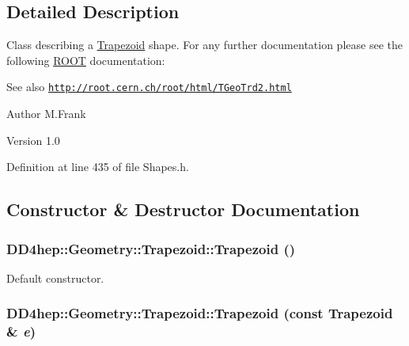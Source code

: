 \subsection{Detailed Description}
Class describing a \hyperlink{class_d_d4hep_1_1_geometry_1_1_trapezoid}{Trapezoid} shape. For any further documentation please see the following \hyperlink{namespace_r_o_o_t}{ROOT} documentation: \begin{DoxySeeAlso}{See also}
\href{http://root.cern.ch/root/html/TGeoTrd2.html}{\tt http://root.cern.ch/root/html/TGeoTrd2.html}
\end{DoxySeeAlso}
\begin{DoxyAuthor}{Author}
M.Frank 
\end{DoxyAuthor}
\begin{DoxyVersion}{Version}
1.0 
\end{DoxyVersion}


Definition at line 435 of file Shapes.h.

\subsection{Constructor \& Destructor Documentation}
\hypertarget{class_d_d4hep_1_1_geometry_1_1_trapezoid_a98ba02f7b8317e9a68f5a20eae86cf37}{
\subsubsection[{Trapezoid}]{\setlength{\rightskip}{0pt plus 5cm}DD4hep::Geometry::Trapezoid::Trapezoid ()}}
\label{class_d_d4hep_1_1_geometry_1_1_trapezoid_a98ba02f7b8317e9a68f5a20eae86cf37}


Default constructor. \hypertarget{class_d_d4hep_1_1_geometry_1_1_trapezoid_a2af4ca8630cd37bfaf9f45cdb2708c1d}{
\subsubsection[{Trapezoid}]{\setlength{\rightskip}{0pt plus 5cm}DD4hep::Geometry::Trapezoid::Trapezoid (const {\bf Trapezoid} \& {\em e})}}
\label{class_d_d4hep_1_1_geometry_1_1_trapezoid_a2af4ca8630cd37bfaf9f45cdb2708c1d}


